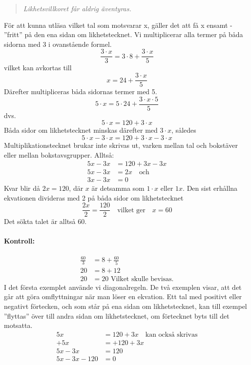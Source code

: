 \begin{quote}\emph{
Likhetsvillkoret får aldrig äventyras.
}\end{quote}

För att kunna utläsa vilket tal som motsvarar x, gäller det att få x ensamt -
''fritt'' på den ena sidan om likhetstecknet.
Vi multiplicerar alla termer på båda sidorna med 3 i ovanstående formel.
\[\frac{3 \cdot x}{3} = 3 \cdot 8 + \frac{3 \cdot x}{5}\]
vilket kan avkortas till
\[x = 24 + \frac{3 \cdot x}{5}\]
Därefter multipliceras båda sidornas termer med 5.
\[5 \cdot x = 5 \cdot 24 + \frac{3 \cdot x \cdot 5}{5}\]
dvs.
\[5 \cdot x = 120 + 3 \cdot x\]
Båda sidor om likhetstecknet minskas därefter med \(3 \cdot x\), således
\[5 \cdot x - 3 \cdot x = 120 + 3 \cdot x - 3 \cdot x\]
Multiplikationstecknet brukar inte skrivas ut, varken mellan tal och bokstäver
eller mellan bokstavsgrupper.
Alltså:
\begin{align*}
5x - 3x &= 120 + 3x - 3x \\
5x - 3x &= 2x \quad \text{och} \\
3x - 3x &= 0
\end{align*}
Kvar blir då \(2x = 120\), där \(x\) är detsamma som \(1 \cdot x\) eller \(1x\).
Den sist erhållna ekvationen divideras med 2 på båda sidor om likhetstecknet
\[
\frac{2x}{2} = \frac{120}{2}
\quad \text{vilket ger} \quad
x = 60
\]
Det sökta talet är alltså 60.

\paragraph{Kontroll:}

\begin{align*}
\frac{60}{3} & = 8 + \frac{60}{5}\\
          20 &= 8 + 12 \\
          20 &= 20\text{ Vilket skulle bevisas.}
\end{align*}
I det första exemplet använde vi diagonalregeln.
De två exemplen visar, att det går att göra omflyttningar när man löser en
ekvation.
Ett tal med positivt eller negativt förtecken, och som står på ena sidan om
likhetstecknet, kan till exempel ''flyttas'' över till andra sidan om likhetstecknet,
om förtecknet byts till det motsatta.
\begin{align*}
  5x &= 120 + 3x \quad \text{kan också skrivas} \\
  +5x &= +120+ 3x \\
  5x-3x &= 120 \\
  5x- 3x-120 &= 0 \\
\end{align*}

